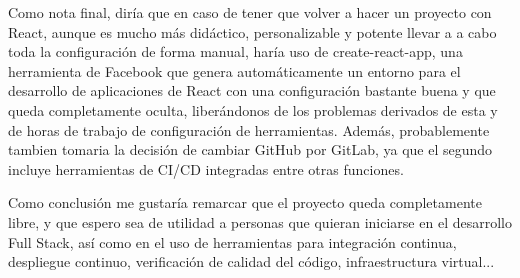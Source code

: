 Como nota final, diría que en caso de tener que volver a hacer un proyecto con React, aunque es mucho más didáctico, personalizable y potente llevar a a cabo toda la configuración de forma manual, haría uso de create-react-app, una herramienta de Facebook que genera automáticamente un entorno para el desarrollo de aplicaciones de React con una configuración bastante buena y que queda completamente oculta, liberándonos de los problemas derivados de esta y de horas de trabajo de configuración de herramientas. Además, probablemente tambien tomaria la decisión de cambiar GitHub por GitLab, ya que el segundo incluye herramientas de CI/CD integradas entre otras funciones.

Como conclusión me gustaría remarcar que el proyecto queda completamente libre, y que espero sea de utilidad a personas que quieran iniciarse en el desarrollo Full Stack, así como en el uso de herramientas para integración continua, despliegue continuo, verificación de calidad del código, infraestructura virtual...
